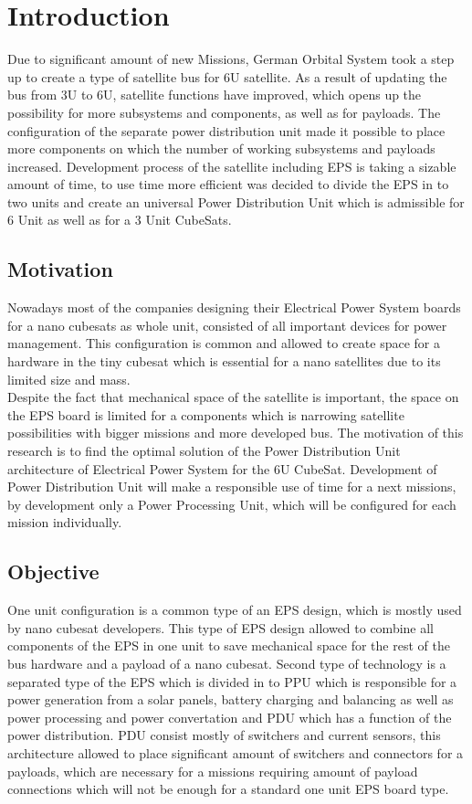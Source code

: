\chapter{Introduction\label{cha:chapter1}}
Due to significant amount of new Missions, German Orbital System took a step up to create a type of satellite bus for 6U satellite.  As a result of updating the bus from 3U to 6U, satellite functions have improved, which opens up the possibility for more subsystems and components, as well as for payloads. The configuration of the separate power distribution unit made it possible to place more components on which the number of working subsystems and payloads increased. Development process of the satellite including EPS is taking a sizable amount of time, to use time more efficient was decided to divide the EPS in to two units and create an universal Power Distribution Unit which is admissible for 6 Unit as well as for a 3 Unit CubeSats. 
 

\section{Motivation\label{sec:moti}}
Nowadays most of the companies designing their Electrical Power System boards for a nano cubesats as whole unit, consisted of all important devices for power management. This configuration is common and allowed to create space for a hardware in the tiny cubesat which is essential for a nano satellites due to its limited size and mass. 
\\  Despite the fact that mechanical space of the satellite is important, the space on the EPS board is limited for a components which is narrowing satellite possibilities with bigger missions and more developed bus. 
The motivation of this research is to find the optimal solution of the Power Distribution Unit architecture of Electrical Power System for the 6U CubeSat. Development of Power Distribution Unit will make a responsible use of time for a next missions, by development only a Power Processing Unit, which will be configured for each mission individually.

\section{Objective\label{sec:objective}}

One unit configuration is a common type of an EPS design, which is mostly used by nano cubesat developers. This type of EPS design allowed to combine all components of the EPS in one unit to save mechanical space for the rest of the bus hardware and a payload of a nano cubesat. Second type of technology is a separated type of the EPS which is divided in to PPU which is responsible for a power generation from a solar panels, battery charging and balancing as well as power processing and power convertation and PDU which has a function of the power distribution. PDU consist mostly of switchers and current sensors, this architecture allowed to place significant amount of switchers and connectors for a payloads, which are necessary for a missions requiring amount of payload connections which will not be enough for a standard one unit EPS board type. \\

